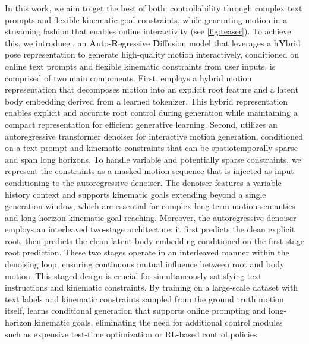 In this work, we aim to get the best of both: controllability through complex text prompts and flexible kinematic goal constraints, while generating motion in a streaming fashion that enables online interactivity (see \cref{fig:teaser}).
To achieve this, we introduce \textbf{\method}, an \textbf{A}uto-\textbf{R}egressive \textbf{D}iffusion model that leverages a h\textbf{Y}brid pose representation to generate high-quality motion interactively, conditioned on online text prompts and flexible kinematic constraints from user inputs.
\method is comprised of two main components. 
First, \method employs a hybrid motion representation that decomposes motion into an explicit root feature and a latent body embedding derived from a learned tokenizer. This hybrid representation enables explicit and accurate root control during generation while maintaining a compact representation for efficient generative learning.
Second, \method utilizes an autoregressive transformer denoiser for interactive motion generation, conditioned on a text prompt and kinematic constraints that can be spatiotemporally sparse and span long horizons.
To handle variable and potentially sparse constraints, we represent the constraints as a masked motion sequence that is injected as input conditioning to the autoregressive denoiser.
The denoiser features a variable history context and supports kinematic goals extending beyond a single generation window, which are essential for complex long-term motion semantics and long-horizon kinematic goal reaching.
Moreover, the autoregressive denoiser employs an interleaved two-stage architecture: it first predicts the clean explicit root, then predicts the clean latent body embedding conditioned on the first-stage root prediction. These two stages operate in an interleaved manner within the denoising loop, ensuring continuous mutual influence between root and body motion. This staged design is crucial for simultaneously satisfying text instructions and kinematic constraints.
By training on a large-scale dataset with text labels and kinematic constraints sampled from the ground truth motion itself, \method learns conditional generation that supports online prompting and long-horizon kinematic goals, eliminating the need for additional control modules~\cite{shi2024amdm,zhao2025DartControl,pinyoanuntapong2025MaskControl} such as expensive test-time optimization or RL-based control policies.



